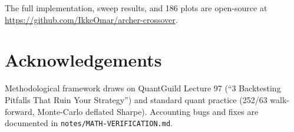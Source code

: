 \documentclass[11pt,a4paper]{article}
\begin{document}
The full implementation, sweep results, and 186 plots are open-source at \url{https://github.com/IkkeOmar/archer-crossover}.

\section*{Acknowledgements}

Methodological framework draws on QuantGuild Lecture 97 (``3 Backtesting Pitfalls That Ruin Your Strategy'') and standard quant practice (252/63 walk-forward, Monte-Carlo deflated Sharpe). Accounting bugs and fixes are documented in \texttt{notes/MATH-VERIFICATION.md}.
\end{document}
